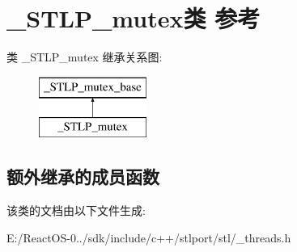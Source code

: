 \hypertarget{class___s_t_l_p__mutex}{}\section{\+\_\+\+S\+T\+L\+P\+\_\+mutex类 参考}
\label{class___s_t_l_p__mutex}
类 \+\_\+\+S\+T\+L\+P\+\_\+mutex 继承关系图\+:\begin{figure}[H]
\begin{center}
\leavevmode
\includegraphics[height=2.000000cm]{class___s_t_l_p__mutex}
\end{center}
\end{figure}
\subsection*{额外继承的成员函数}


该类的文档由以下文件生成\+:\begin{DoxyCompactItemize}
\item 
E\+:/\+React\+O\+S-\/0../sdk/include/c++/stlport/stl/\+\_\+threads.\+h\end{DoxyCompactItemize}
